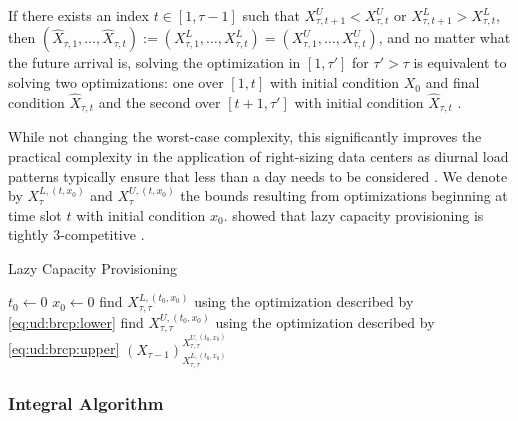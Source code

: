 \begin{lemma}
If there exists an index $t \in [1, \tau-1]$ such that $X_{\tau,t+1}^U < X_{\tau,t}^U$ or $X_{\tau,t+1}^L > X_{\tau,t}^L$, then $(\hat{X}_{\tau,1},\dots,\hat{X}_{\tau,t}) := (X_{\tau,1}^L,\dots,X_{\tau,t}^L) = (X_{\tau,1}^U,\dots,X_{\tau,t}^U)$, and no matter what the future arrival is, solving the optimization in $[1,\tau']$ for $\tau' > \tau$ is equivalent to solving two optimizations: one over $[1,t]$ with initial condition $X_0$ and final condition $\hat{X}_{\tau,t}$ and the second over $[t+1,\tau']$ with initial condition $\hat{X}_{\tau,t}$ \cite{Lin2011}.
\end{lemma}

While not changing the worst-case complexity, this significantly improves the practical complexity in the application of right-sizing data centers as diurnal load patterns typically ensure that less than a day needs to be considered \cite{Lin2011}. We denote by $X_{\tau}^{L,(t,x_0)}$ and $X_{\tau}^{U,(t,x_0)}$ the bounds resulting from optimizations beginning at time slot $t$ with initial condition $x_0$. \citeauthor*{Lin2011} showed that lazy capacity provisioning is tightly $3$-competitive \cite{Lin2011}.

\begin{algorithm}
    \caption{Lazy Capacity Provisioning \cite{Lin2011}}\label{alg:ud:lcp}
    $t_0 \gets 0$\;
    $x_0 \gets 0$\;
    find $X_{\tau,\tau}^{L,(t_0,x_0)}$ using the optimization described by \autoref{eq:ud:brcp:lower}\;
    find $X_{\tau,\tau}^{U,(t_0,x_0)}$ using the optimization described by \autoref{eq:ud:brcp:upper}\;
    \Return $(X_{\tau-1})_{X_{\tau,\tau}^{L,(t_0,x_0)}}^{X_{\tau,\tau}^{U,(t_0,x_0)}}$\;
\end{algorithm}

\subsubsection{Integral Algorithm}

